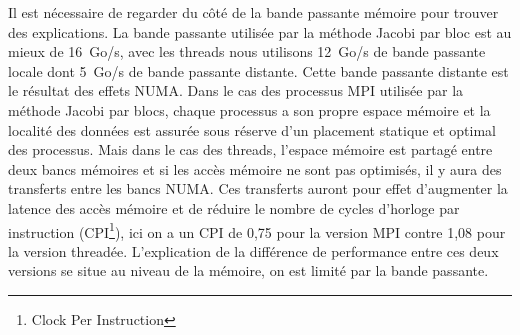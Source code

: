 Il est nécessaire de regarder du côté de la bande passante mémoire pour trouver des explications.
%
La bande passante utilisée par la méthode Jacobi par bloc est au mieux de 16~Go/s, avec les threads nous utilisons 12~Go/s de bande passante locale dont 5~Go/s de bande passante distante.
%
Cette bande passante distante est le résultat des effets NUMA.
%
Dans le cas des processus MPI utilisée par la méthode Jacobi par blocs, chaque processus a son propre espace mémoire et la localité des données est assurée sous réserve d'un placement statique et optimal des processus.
%
Mais dans le cas des threads, l'espace mémoire est partagé entre deux bancs mémoires et si les accès mémoire ne sont pas optimisés, il y aura des transferts entre les bancs NUMA.
%
Ces transferts auront pour effet d'augmenter la latence des accès mémoire et de réduire le nombre de cycles d'horloge par instruction (CPI\footnote{Clock Per Instruction}), ici on a un CPI de 0,75 pour la version MPI contre 1,08 pour la version threadée.
%
L'explication de la différence de performance entre ces deux versions se situe au niveau de la mémoire, on est limité par la bande passante.

